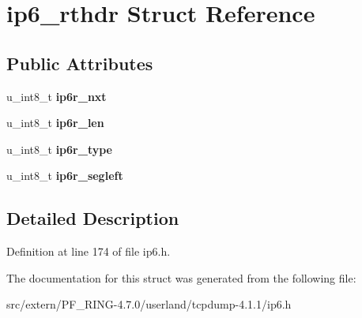 \hypertarget{structip6__rthdr}{
\section{ip6\_\-rthdr Struct Reference}
\label{structip6__rthdr}
}
\subsection*{Public Attributes}
\begin{DoxyCompactItemize}
\item 
\hypertarget{structip6__rthdr_ac566c6e8acbb3f631fa3238fae3eb6d0}{
u\_\-int8\_\-t {\bfseries ip6r\_\-nxt}}
\label{structip6__rthdr_ac566c6e8acbb3f631fa3238fae3eb6d0}

\item 
\hypertarget{structip6__rthdr_a87065e39b6a823c5a28378e7095e547f}{
u\_\-int8\_\-t {\bfseries ip6r\_\-len}}
\label{structip6__rthdr_a87065e39b6a823c5a28378e7095e547f}

\item 
\hypertarget{structip6__rthdr_a0ee97e652ec89bb0914c600970e15f0a}{
u\_\-int8\_\-t {\bfseries ip6r\_\-type}}
\label{structip6__rthdr_a0ee97e652ec89bb0914c600970e15f0a}

\item 
\hypertarget{structip6__rthdr_a0e08fa85b85e1aad586884554bcc919a}{
u\_\-int8\_\-t {\bfseries ip6r\_\-segleft}}
\label{structip6__rthdr_a0e08fa85b85e1aad586884554bcc919a}

\end{DoxyCompactItemize}


\subsection{Detailed Description}


Definition at line 174 of file ip6.h.



The documentation for this struct was generated from the following file:\begin{DoxyCompactItemize}
\item 
src/extern/PF\_\-RING-\/4.7.0/userland/tcpdump-\/4.1.1/ip6.h\end{DoxyCompactItemize}
